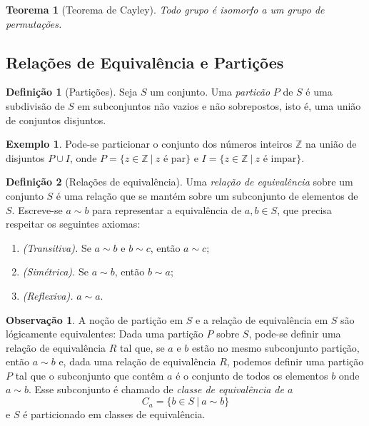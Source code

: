 \documentclass[a4paper,12pt]{report}
\theoremstyle{plain}
\newtheorem{teorema}{Teorema}[section]
\theoremstyle{definition}
\newtheorem{definicao}{Definição}[section]
\newtheorem{observacao}{Observação}[section]
\newtheorem{exemplo}{Exemplo}[section]
\begin{document}
\begin{teorema}[Teorema de Cayley]
	Todo grupo é isomorfo a um grupo de permutações.
\end{teorema}

\subsection{Relações de Equivalência e Partições}

\begin{definicao}[Partições]
	Seja \(S\) um conjunto. Uma \emph{particão} \(P\) de
	\(S\) é uma subdivisão de \(S\) em subconjuntos não vazios e não
	sobrepostos, isto é, uma união de conjuntos disjuntos.	
\end{definicao}

\begin{exemplo}
	Pode-se particionar o conjunto dos números inteiros
	\(\mathbb{Z}\) na união de disjuntos \(P\cup I\), onde
	\(P = \{z \in \mathbb{Z} \ |\ z \text{ é par}\}\) e
	\(I = \{z \in \mathbb{Z} \ |\ z \text{ é impar}\}\).
\end{exemplo}

\begin{definicao}[Relações de equivalência]
	Uma \emph{relação de equivalência} sobre um conjunto
	\(S\) é uma relação que se mantém sobre um subconjunto de elementos de
	\(S\). Escreve-se \(a\sim b\) para representar a equivalência de
	\(a, b \in S\), que precisa respeitar os seguintes axiomas:
	\begin{enumerate}
		\item \emph{(Transitiva).} Se \(a\sim b\) e \(b\sim c\), então \(a\sim c\);
		\item \emph{(Simétrica).} Se \(a\sim b\), então \(b\sim a\);
		\item \emph{(Reflexiva).} \(a\sim a\).
	\end{enumerate}
\end{definicao}

\begin{observacao}
	A noção de partição em \(S\) e a relação de equivalência em \(S\) são
	lógicamente equivalentes: Dada uma partição \(P\) sobre \(S\), pode-se
	definir uma relação de equivalência \(R\) tal que, se \(a\) e \(b\)
	estão no mesmo subconjunto partição, então \(a\sim b\) e, dada uma
	relação de equivalência \(R\), podemos definir uma partição \(P\) tal
	que o subconjunto que contêm \(a\) é o conjunto de todos os elementos
	\(b\) onde \(a\sim b\). Esse subconjunto é chamado de \emph{classe de
		equivalência de \(a\)}
	\[C_a = \{b\in S \ | \ a\sim b\}\]
	e \(S\) é particionado em classes de equivalência.
\end{observacao}
\end{document}
